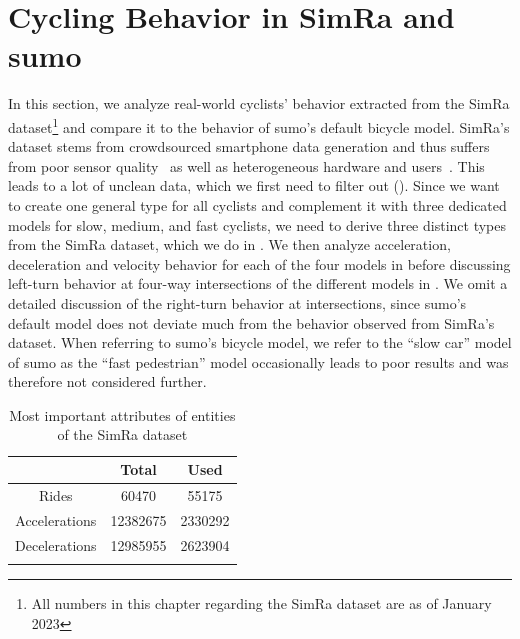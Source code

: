 \section{Cycling Behavior in SimRa and \ac{sumo}}
\label{sec:cycling_behavior_in_simra_and_sumo}
In this section, we analyze real-world cyclists' behavior extracted from the SimRa dataset\footnote{All numbers in this chapter regarding the SimRa dataset are as of January 2023} and compare it to the behavior of \ac{sumo}'s default bicycle model.
SimRa's dataset stems from crowdsourced smartphone data generation and thus suffers from poor sensor quality~\cite{chowdhury2014estimating, usami2018bicycle} as well as heterogeneous hardware and users~\cite{basiri2018impact}.
This leads to a lot of unclean data, which we first need to filter out ().
Since we want to create one general type for all cyclists and complement it with three dedicated models for slow, medium, and fast cyclists, we need to derive three distinct types from the SimRa dataset, which we do in .
We then analyze acceleration, deceleration and velocity behavior for each of the four models in  before discussing left-turn behavior at four-way intersections of the different models in .
We omit a detailed discussion of the right-turn behavior at intersections, since \ac{sumo}'s default model does not deviate much from the behavior observed from SimRa's dataset.
When referring to \ac{sumo}'s bicycle model, we refer to the ``slow car'' model of \ac{sumo} as the ``fast pedestrian'' model occasionally leads to poor results and was therefore not considered further.

\begin{table}
\centering
\caption{Most important attributes of entities of the SimRa dataset}%
\label{tab:dataset}
\begin{tabular}{ccc}
\toprule
& Total & Used \\
\midrule
\midrule
Rides & \num{60470} & \num{55175} \\
Accelerations & \num{12382675} & \num{2330292} \\
Decelerations & \num{12985955} & \num{2623904} \\
\bottomrule&
\end{tabular}
\end{table}

